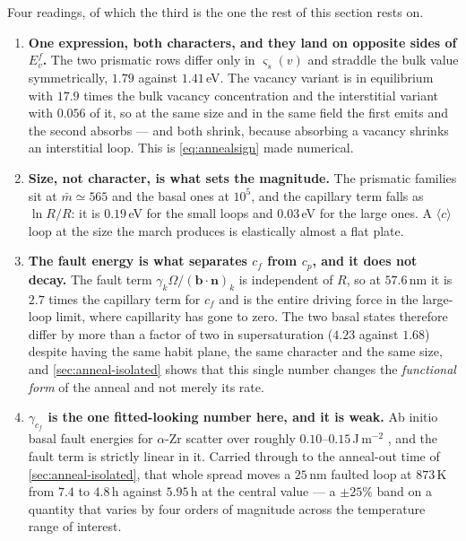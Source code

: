 \documentclass{article}
\newcommand{\cloop}{\ensuremath{\langle c\rangle}}
\newcommand{\bvec}{\bm b}
\newcommand{\nvec}{\bm n}
\begin{document}
Four readings, of which the third is the one the rest of this section rests on.

\begin{enumerate}
\item \textbf{One expression, both characters, and they land on opposite sides of
      $E^f_v$.} The two prismatic rows differ only in $\varsigma_s(v)$ and
      straddle the bulk value symmetrically, $1.79$ against $1.41\,$eV. The
      vacancy variant is in equilibrium with $17.9$ times the bulk vacancy
      concentration and the interstitial variant with $0.056$ of it, so at the
      same size and in the same field the first emits and the second absorbs ---
      and both shrink, because absorbing a vacancy shrinks an interstitial loop.
      This is \cref{eq:annealsign} made numerical.
\item \textbf{Size, not character, is what sets the magnitude.} The prismatic
      families sit at $\bar m\simeq565$ and the basal ones at $10^{5}$, and the
      capillary term falls as $\ln R/R$: it is $0.19\,$eV for the small loops and
      $0.03\,$eV for the large ones. A \cloop{} loop at the size the march
      produces is elastically almost a flat plate.
\item \textbf{The fault energy is what separates $c_f$ from $c_p$, and it does
      not decay.} The fault term $\gamma_k\Omega/(\bvec\!\cdot\!\nvec)_k$ is
      independent of $R$, so at $57.6\,$nm it is $2.7$ times the capillary term
      for $c_f$ and is the entire driving force in the large-loop limit, where
      capillarity has gone to zero. The two basal states therefore differ by more
      than a factor of two in supersaturation ($4.23$ against $1.68$) despite
      having the same habit plane, the same character and the same size, and
      \cref{sec:anneal-isolated} shows that this single number changes the
      \emph{functional form} of the anneal and not merely its rate.
\item \textbf{$\gamma_{c_f}$ is the one fitted-looking number here, and it is
      weak.} Ab initio basal fault energies for $\alpha$-Zr scatter over roughly
      $0.10$--$0.15\,$J\,m$^{-2}$
      \citep{varvenne2014vacancy,christiaen2019new}, and the fault term is
      strictly linear in it. Carried through to the anneal-out time of
      \cref{sec:anneal-isolated}, that whole spread moves a $25\,$nm faulted loop
      at $873\,$K from $7.4$ to $4.8\,$h against $5.95\,$h at the central value
      --- a $\pm25\%$ band on a quantity that varies by four orders of magnitude
      across the temperature range of interest.
\end{enumerate}
\end{document}
